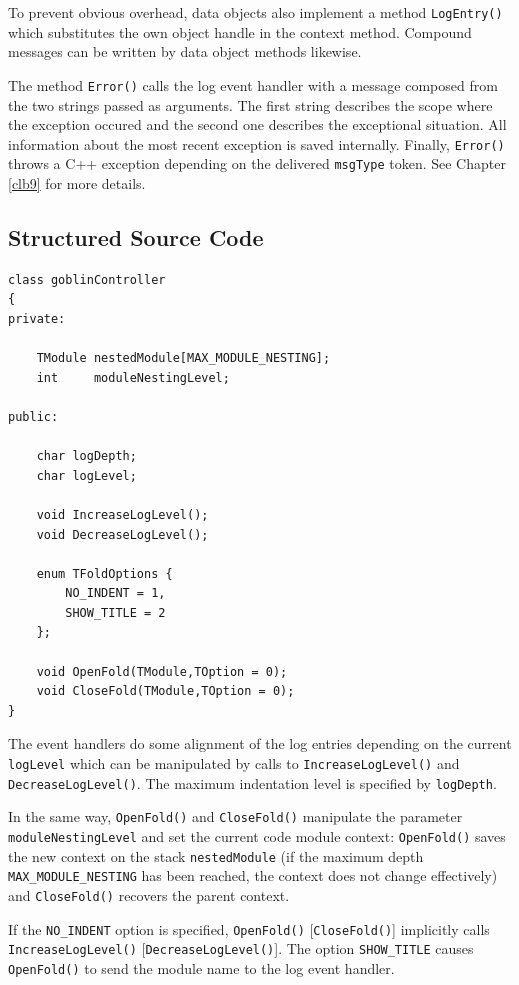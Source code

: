 \documentclass[a4paper,11pt,twoside]{book}
\begin{document}
\begin{multicols}{2}
To prevent obvious overhead, data objects also implement a method
\verb/LogEntry()/ which substitutes the own object handle in the context
method. Compound messages can be written by data object methods likewise.

The method \verb/Error()/ calls the log event handler with a message composed
from the two strings passed as arguments. The first string describes the scope
where the exception occured and the second one describes the exceptional
situation. All information about the most recent exception is saved internally.
Finally, \verb/Error()/ throws a C++ exception depending on the delivered
\verb/msgType/ token. See Chapter \ref{clb9} for more details.


\newpage
\subsection{Structured Source Code}
\begin{mymethods}
\begin{verbatim}
class goblinController
{
private:

    TModule nestedModule[MAX_MODULE_NESTING];
    int     moduleNestingLevel;

public:
    
    char logDepth;
    char logLevel;

    void IncreaseLogLevel();
    void DecreaseLogLevel();

    enum TFoldOptions {
        NO_INDENT = 1,
        SHOW_TITLE = 2
    };

    void OpenFold(TModule,TOption = 0);
    void CloseFold(TModule,TOption = 0);
}
\end{verbatim}
\end{mymethods}
The event handlers do some alignment of the log entries depending on the
current \verb/logLevel/ which can be manipulated by calls to
\verb/IncreaseLogLevel()/ and \verb/DecreaseLogLevel()/. The maximum
indentation level is specified by \verb/logDepth/.

In the same way, \verb/OpenFold()/ and \verb/CloseFold()/ manipulate the
parameter \verb/moduleNestingLevel/ and set the current code module context:
\verb/OpenFold()/ saves the new context on the stack \verb/nestedModule/ (if
the maximum depth \verb/MAX_MODULE_NESTING/ has been reached, the context
does not change effectively) and \verb/CloseFold()/ recovers the parent
context.

If the \verb/NO_INDENT/ option is specified, \verb/OpenFold()/
[\verb/CloseFold()/] implicitly calls \verb/IncreaseLogLevel()/
[\verb/DecreaseLogLevel()/]. The option \verb/SHOW_TITLE/ causes
\verb/OpenFold()/ to send the module name to the log event handler.


\end{multicols}
\end{document}
